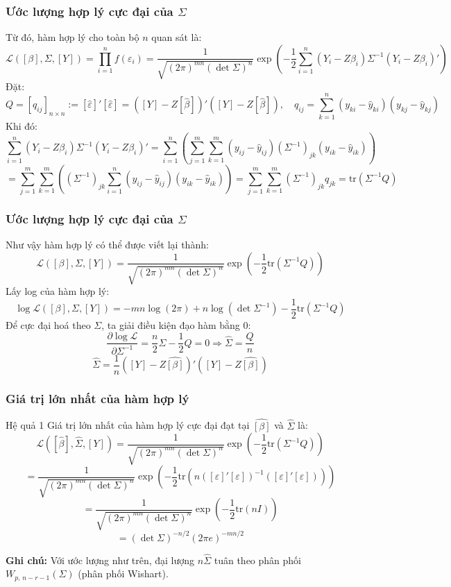 \begin{frame}
\frametitle{Ước lượng hợp lý cực đại của $\Sigma$}
Từ đó, hàm hợp lý cho toàn bộ $n$ quan sát là:
{\scriptsize
\[
\mathcal{L}([\beta], \Sigma, [Y])
= \prod_{i=1}^{n} f(\varepsilon_i)
= \frac{1}{\sqrt{(2\pi)^{mn}(\det \Sigma)^{n}}}
\exp\!\left(
-\frac{1}{2}
\sum_{i=1}^{n}
(Y_i - Z\beta_i)\Sigma^{-1}(Y_i - Z\beta_i)'
\right)
\]}
Đặt:
\[
Q = [q_{ij}]_{n\times n}
:= [\widehat{\varepsilon}]'[\widehat{\varepsilon}]
= ([Y] - Z[\widehat{\beta}])'([Y] - Z[\widehat{\beta}])
, \quad
q_{ij} = \sum_{k=1}^{n} (y_{ki} - \widehat{y}_{ki})(y_{kj} - \widehat{y}_{kj})
\]
Khi đó:
\[
\sum_{i=1}^{n} (Y_i - Z\beta_i)\Sigma^{-1}(Y_i - Z\beta_i)'
= \sum_{i=1}^{n} \left( \sum_{j=1}^{m} \sum_{k=1}^{m}
(y_{ij} - \widehat{y}_{ij})(\Sigma^{-1})_{jk}(y_{ik} - \widehat{y}_{ik}) \right)
\]
\[
= \sum_{j=1}^{m} \sum_{k=1}^{m}\left(  (\Sigma^{-1})_{jk}
\sum_{i=1}^{n} (y_{ij} - \widehat{y}_{ij})(y_{ik} - \widehat{y}_{ik}) \right)
= \sum_{j=1}^{m} \sum_{k=1}^{m} (\Sigma^{-1})_{jk} q_{jk}
= \mathrm{tr}(\Sigma^{-1} Q)
\]
\end{frame}

\begin{frame}
\frametitle{Ước lượng hợp lý cực đại của $\Sigma$}
Như vậy hàm hợp lý có thể được viết lại thành:
\[
\boxed{
\mathcal{L}([\beta],\Sigma,[Y]) =
\frac{1}{\sqrt{(2\pi)^{mn}(\det\Sigma)^{n}}}
\exp\!\left(-\frac{1}{2}\mathrm{tr}(\Sigma^{-1}Q)\right)
}
\]
Lấy log của hàm hợp lý:
\[
\log\mathcal{L}([\beta],\Sigma,[Y]) 
= -mn\log(2\pi) +n\log(\det\Sigma^{-1}) 
- \frac{1}{2}\mathrm{tr}(\Sigma^{-1}Q)
\]
Để cực đại hoá theo $\Sigma$, ta giải điều kiện đạo hàm bằng 0:
\[
\frac{\partial\log\mathcal{L}}{\partial\Sigma^{-1}} 
= \frac{n}{2}\Sigma - \frac{1}{2}Q = 0
\Rightarrow
\widehat{\Sigma} = \frac{Q}{n}
\]
\[
\boxed{
\widehat{\Sigma} = \frac{1}{n}([Y]-Z\widehat{[\beta]})'([Y]-Z\widehat{[\beta]})
}
\]
\end{frame}

\begin{frame}
\frametitle{Giá trị lớn nhất của hàm hợp lý}
\begin{block}{Hệ quả 1}
Giá trị lớn nhất của hàm hợp lý cực đại đạt tại $\widehat{[\beta]}$ và $\widehat{\Sigma}$ là:
\[
\mathcal{L}([\widehat{\beta}], \widehat{\Sigma}, [Y])
= \frac{1}{\sqrt{(2\pi)^{mn} (\det \Sigma)^{n}}}
\exp\!\left(-\frac{1}{2}\mathrm{tr}(\Sigma^{-1} Q)\right)
\]
\[
= \frac{1}{\sqrt{(2\pi)^{mn} (\det \Sigma)^{n}}}
\exp\!\left(-\frac{1}{2}\mathrm{tr}\!\left(n([\varepsilon]'[\varepsilon])^{-1}([\varepsilon]'[\varepsilon])\right)\right)
\]
\[
= \frac{1}{\sqrt{(2\pi)^{mn} (\det \Sigma)^{n}}}
\exp\!\left(-\frac{1}{2}\mathrm{tr}(nI)\right)
\]
\[
= (\det \Sigma)^{-n/2}(2\pi e)^{-mn/2}
\]
\end{block}
\textbf{Ghi chú:} Với ước lượng như trên, đại lượng $n\widehat{\Sigma}$ tuân theo phân phối $W_{p,\,n-r-1}(\Sigma)$ (phân phối Wishart).
\end{frame}


